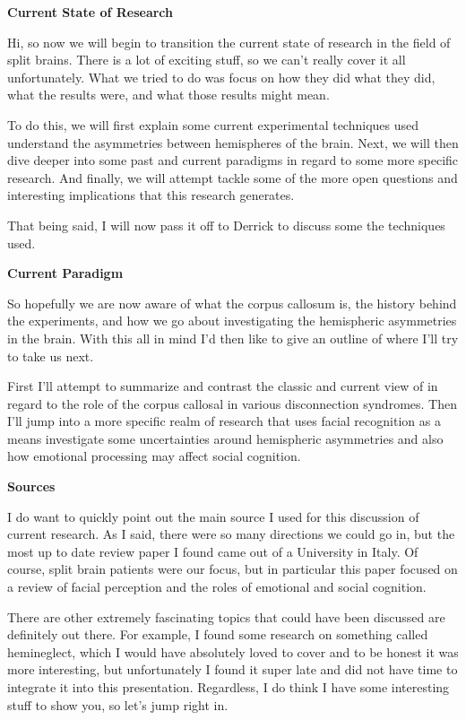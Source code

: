 \documentclass[basic]{inVerba-notes}
\begin{document}
    
\textbf{Current State of Research}

Hi, so now we will begin to transition the current state of research in the field of split brains. There is a lot of exciting stuff, so we can't really cover it all unfortunately. What we tried to do was focus on how they did what they did, what the results were, and what those results might mean.

To do this, we will first explain some current experimental techniques used understand the asymmetries between hemispheres of the brain. Next, we will then dive deeper into some past and current paradigms in regard to some more specific research. And finally, we will attempt tackle some of the more open questions and interesting implications that this research generates.

That being said, I will now pass it off to Derrick to discuss some the techniques used.

\textbf{Current Paradigm}

So hopefully we are now aware of what the corpus callosum is, the history behind the experiments, and how we go about investigating the hemispheric asymmetries in the brain. With this all in mind I'd then like to give an outline of where I'll try to take us next.

First I'll attempt to summarize and contrast the classic and current view of in regard to the role of the corpus callosal in various disconnection syndromes. Then I'll jump into a more specific realm of research that uses facial recognition as a means investigate some uncertainties around hemispheric asymmetries and also how emotional processing may affect social cognition.

\textbf{Sources}
 
I do want to quickly point out the main source I used for this discussion of current research. As I said, there were so many directions we could go in, but the most up to date review paper I found came out of a University in Italy. Of course, split brain patients were our focus, but in particular this paper focused on a review of facial perception and the roles of emotional and social cognition. 

There are other extremely fascinating topics that could have been discussed are definitely out there. For example, I found some research on something called hemineglect, which I would have absolutely loved to cover and to be honest it was more interesting, but unfortunately I found it super late and did not have time to integrate it into this presentation. Regardless, I do think I have some interesting stuff to show you, so let's jump right in. 
\end{document}
